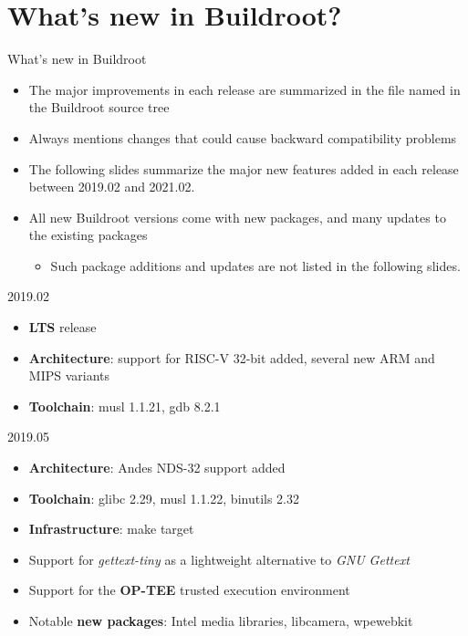 \section{What's new in Buildroot?}

\begin{frame}{What's new in Buildroot}
  \begin{itemize}
  \item The major improvements in each release are summarized in the
    file named  in the Buildroot source tree
  \item Always mentions changes that could cause backward
    compatibility problems
  \item The following slides summarize the major new features added in
    each release between 2019.02 and 2021.02.
  \item All new Buildroot versions come with new packages, and many
    updates to the existing packages
    \begin{itemize}
    \item Such package additions and updates are not listed in the
      following slides.
    \end{itemize}
  \end{itemize}
\end{frame}

\begin{frame}{2019.02}
  \begin{itemize}
  \item {\bf LTS} release
  \item {\bf Architecture}: support for RISC-V 32-bit added, several
    new ARM and MIPS variants
  \item {\bf Toolchain}: musl 1.1.21, gdb 8.2.1
  \end{itemize}
\end{frame}

\begin{frame}{2019.05}
  \begin{itemize}
  \item {\bf Architecture}: Andes NDS-32 support added
  \item {\bf Toolchain}: glibc 2.29, musl 1.1.22, binutils 2.32
  \item {\bf Infrastructure}:  make target
  \item Support for {\em gettext-tiny} as a lightweight alternative to
    {\em GNU Gettext}
  \item Support for the {\bf OP-TEE} trusted execution environment
  \item Notable {\bf new packages}: Intel media libraries, libcamera,
    wpewebkit
  \end{itemize}
\end{frame}

